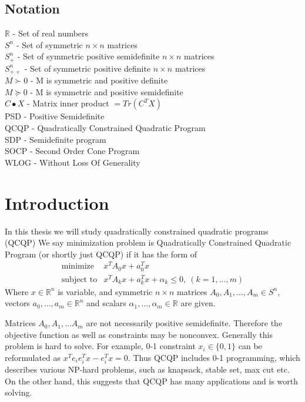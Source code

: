 \documentclass[10pt,oneside]{book}
\author{Matúš Stehlík}
\theoremstyle{definition}
\begin{document}
\section*{Notation}

$\mathbb{R}$ - Set of real numbers \\
$S^n$ - Set of symmetric $n\times n$ matrices \\
$S^n_+$ - Set of symmetric positive semidefinite $n\times n$ matrices \\
$S^n_{++}$ - Set of symmetric positive definite $n\times n$ matrices \\
$M\succ 0$ - M is symmetric and positive definite \\
$M\succeq 0$ - M is symmetric and positive semidefinite \\
$C\bullet X$ - Matrix inner product $=Tr(C^TX)$\\

PSD - Positive Semidefinite \\

QCQP - Quadratically Constrained Quadratic Program \\
SDP - Semidefinite program \\
SOCP - Second Order Cone Program \\

WLOG - Without Loss Of Generality

\chapter{Introduction}

In this thesis we will study quadratically constrained quadratic programs (QCQP)
\label{defQCQP}
We say minimization problem is Quadratically Constrained Quadratic Program (or shortly just QCQP) if it has the form of
\begin{equation}
\label{qcqp} 
\begin{array}{ll}
\mbox{minimize}& x^TA_0x + a_0^Tx \\
\mbox{subject to}& x^TA_kx + a_k^Tx + \alpha_k \leq 0, \  (k = 1,\dots ,m)
\end{array} 
\end{equation}
Where $x\in \mathbb{R}^n$ is variable, and symmetric $n\times n$ matrices $A_0, A_1, \dots ,A_m \in S^n$, vectors $a_0,\dots ,a_m \in \mathbb{R}^n$ and scalars $\alpha_1,\dots ,\alpha_m\in \mathbb{R}$ are given.

Matrices $A_0, A_1, \dots A_m$ are not necessarily positive semidefinite. Therefore the objective function as well as constraints may be nonconvex. Generally this problem is hard to solve. For example, 0-1 constraint $x_i\in \{0,1\}$ can be reformulated as $x^Te_ie_i^Tx - e_i^Tx =0$. Thus QCQP includes 0-1 programming, which describes various NP-hard problems, such as knapsack, stable set, max cut etc. On the other hand, this suggests that QCQP has many applications and is worth solving.
\end{document}

